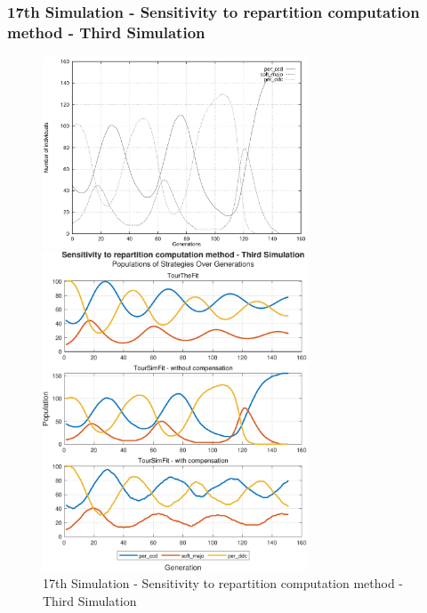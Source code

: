 \documentclass[12pt]{article}
\begin{document}
\subsubsection{17th Simulation - Sensitivity to repartition computation method - Third Simulation}
	\begin{figure}[h]
	    \centering
		\includegraphics[width=0.7\textwidth]{RefPaperFigures/fig12b.jpeg}\par\vspace{0.5em}
	    \includegraphics[width=0.7\textwidth]{Sensitivity to repartition computation method - Third Simulation.pdf}
	    \caption{17th Simulation - Sensitivity to repartition computation method - Third Simulation}
	    \label{fig:Monotonous Convergence}
	\end{figure}
\clearpage
\end{document}
